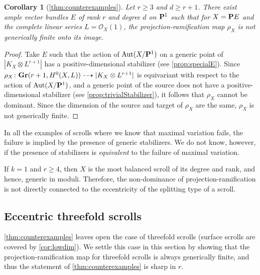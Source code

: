 \documentclass[11pt,reqno]{amsart}
\theoremstyle{plain}
\newtheorem{corollary}[theorem]{Corollary}
\theoremstyle{definition}
\theoremstyle{remark}
\numberwithin{equation}{section}
\numberwithin{equation}{section}
\renewcommand{\O}{\mathcal O}
\begin{document}
\begin{corollary}[\autoref{thm:counterexamples}]
  \label{cor:actualcounterexamples}
  Let $r \geq 3$ and $d \geq r+1$.
  There exist ample vector bundles $E$ of rank $r$ and degree $d$ on $\P^1$ such that for $X = \P E$ and the complete linear series $L = \O_X(1)$, the projection-ramification map $\rho_X$ is not generically finite onto its image.
\end{corollary}
\begin{proof}
  Take $E$ such that the action of $\Aut(X/\P^1)$ on a generic point of $|K_X\otimes L^{r+1}|$ has a positive-dimensional stabilizer (see \autoref{prop:specialE}).
  Since $\rho_X \from \Gr(r+1, H^0(X, L)) \dashrightarrow |K_X \otimes L^{r+1}|$ is equivariant with respect to the action of $\Aut(X/\P^1)$, and a generic
  point of the source does not have a positive-dimensional stabilizer (see \autoref{prop:trivialStabilizer}), it follows that $\rho_X$ cannot be dominant.
  Since the dimension of the source and target of $\rho_X$ are the same, $\rho_X$ is not generically finite.
\end{proof}

\begin{remark}
In all the examples of scrolls where we know that maximal variation fails, the failure is implied by the presence of generic stabilizers.
We do not know, however, if the presence of stabilizers is {\sl equivalent} to the failure of maximal variation.
\end{remark}

\begin{remark}
  If $k = 1$ and $r \geq 4$, then $X$ is the most balanced scroll of its degree and rank, and hence, generic in moduli.
  Therefore, the non-dominance of projection-ramification is not directly connected to the eccentricity of the splitting type of a scroll. 
\end{remark}

\subsection{Eccentric threefold scrolls} %
\label{sec:eccentric_threefolds}
\autoref{thm:counterexamples} leaves open the case of threefold scrolls (surface scrolls are covered by \autoref{cor:lowdim}).
We settle this case in this section by showing that the projection-ramification map for threefold scrolls is always generically finite, and thus the statement of \autoref{thm:counterexamples} is sharp in $r$.
\end{document}
